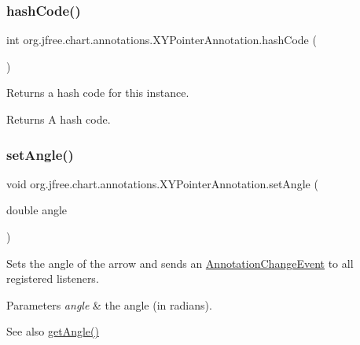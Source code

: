 \subsubsection{\texorpdfstring{hash\+Code()}{hashCode()}}
{\footnotesize\ttfamily int org.\+jfree.\+chart.\+annotations.\+X\+Y\+Pointer\+Annotation.\+hash\+Code (\begin{DoxyParamCaption}{ }\end{DoxyParamCaption})}

Returns a hash code for this instance.

\begin{DoxyReturn}{Returns}
A hash code. 
\end{DoxyReturn}
\mbox{\label{classorg_1_1jfree_1_1chart_1_1annotations_1_1_x_y_pointer_annotation_aae1dfb849164ad0d6ed651dcbd195b3f}} 
\subsubsection{\texorpdfstring{set\+Angle()}{setAngle()}}
{\footnotesize\ttfamily void org.\+jfree.\+chart.\+annotations.\+X\+Y\+Pointer\+Annotation.\+set\+Angle (\begin{DoxyParamCaption}\item[{double}]{angle }\end{DoxyParamCaption})}

Sets the angle of the arrow and sends an \mbox{\hyperlink{}{Annotation\+Change\+Event}} to all registered listeners.


\begin{DoxyParams}{Parameters}
{\em angle} & the angle (in radians).\\
\hline
\end{DoxyParams}
\begin{DoxySeeAlso}{See also}
\mbox{\hyperlink{classorg_1_1jfree_1_1chart_1_1annotations_1_1_x_y_pointer_annotation_a341014ea8ea7ba91ffdbdb77588744c7}{get\+Angle()}} 
\end{DoxySeeAlso}
\mbox{\label{classorg_1_1jfree_1_1chart_1_1annotations_1_1_x_y_pointer_annotation_ab54bd7dea136f2cdeeece616bc0b51d3}} 

